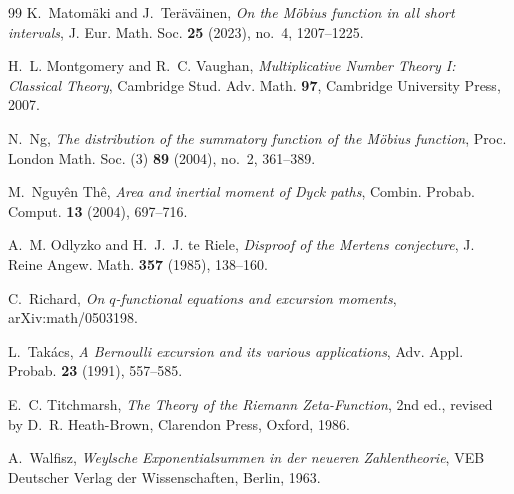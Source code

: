 \documentclass[11pt]{amsart}
\numberwithin{equation}{section}
\theoremstyle{plain}
\theoremstyle{definition}
\theoremstyle{remark}
\begin{document}
\begin{thebibliography}{99}
K.~Matom\"aki and J.~Ter\"av\"ainen, \emph{On the M\"obius function in all
short intervals}, J. Eur. Math. Soc. \textbf{25} (2023), no.~4, 1207--1225.

H.~L. Montgomery and R.~C. Vaughan, \emph{Multiplicative Number Theory I:
Classical Theory}, Cambridge Stud. Adv. Math. \textbf{97}, Cambridge
University Press, 2007.

N.~Ng, \emph{The distribution of the summatory function of the M\"obius
function}, Proc. London Math. Soc. (3) \textbf{89} (2004), no.~2, 361--389.

M.~Nguy\^en Th\^e, \emph{Area and inertial moment of Dyck paths}, Combin.
Probab. Comput. \textbf{13} (2004), 697--716.

A.~M. Odlyzko and H.~J.~J. te Riele, \emph{Disproof of the Mertens
conjecture}, J. Reine Angew. Math. \textbf{357} (1985), 138--160.

C.~Richard, \emph{On $q$-functional equations and excursion moments},
arXiv:math/0503198.

L.~Tak\'acs, \emph{A Bernoulli excursion and its various applications},
Adv. Appl. Probab. \textbf{23} (1991), 557--585.

E.~C. Titchmarsh, \emph{The Theory of the Riemann Zeta-Function}, 2nd ed.,
revised by D.~R. Heath-Brown, Clarendon Press, Oxford, 1986.

A.~Walfisz, \emph{Weylsche Exponentialsummen in der neueren Zahlentheorie},
VEB Deutscher Verlag der Wissenschaften, Berlin, 1963.

\end{thebibliography}
\end{document}
